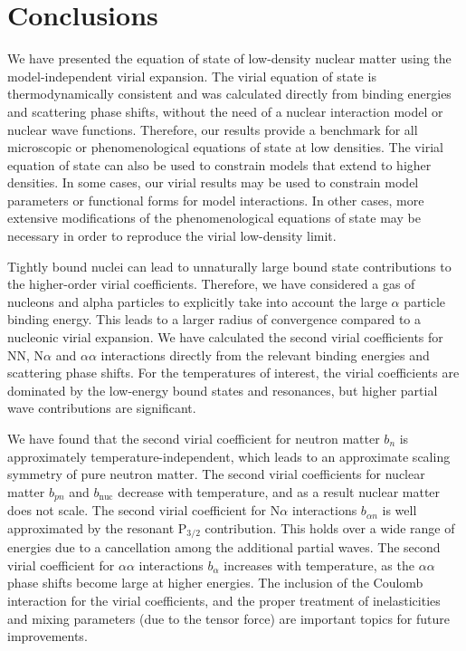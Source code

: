 \documentclass[aps,prc,twocolumn,showpacs,showkeys,amsmath,amssymb]{revtex4}
\begin{document}
\section{Conclusions}
\label{conclusions}

We have presented the equation of state of low-density nuclear 
matter using the model-independent virial expansion. The virial 
equation of state is thermodynamically consistent and was 
calculated directly from binding energies
and scattering phase shifts, without the need of a nuclear
interaction model or nuclear wave functions. Therefore, our
results provide a benchmark for all microscopic or phenomenological
equations of state at low densities. The virial equation of state
can also be used to constrain models that extend to higher densities.
In some cases, our virial results may be used to constrain model 
parameters or functional forms for model interactions. In other cases, 
more extensive modifications of the phenomenological equations of state
may be necessary in order to reproduce the virial low-density limit.

Tightly bound nuclei can lead to unnaturally large bound state
contributions to the higher-order virial coefficients. Therefore,
we have considered a gas of nucleons and alpha particles to 
explicitly take into account the large $\alpha$ particle binding
energy. This leads to a larger radius of convergence compared to 
a nucleonic virial expansion. We have calculated the second
virial coefficients for NN, N$\alpha$ and $\alpha\alpha$ interactions
directly from the relevant binding energies and scattering phase
shifts. For the temperatures of interest, the virial coefficients
are dominated by the low-energy bound states and resonances, but
higher partial wave contributions are significant.

We have found that the second virial coefficient for neutron matter $b_n$
is approximately temperature-independent, which leads to an 
approximate scaling
symmetry of pure neutron matter. The second virial coefficients for
nuclear matter $b_{pn}$ and $b_{\text{nuc}}$ decrease with temperature,
and as a result nuclear matter does not scale. The second virial
coefficient for N$\alpha$ interactions $b_{\alpha n}$
is well approximated by the
resonant P$_{3/2}$ contribution. This holds over a wide range of
energies due to a cancellation among the additional partial waves.
The second virial coefficient for $\alpha\alpha$ interactions 
$b_\alpha$ increases with temperature, as
the $\alpha\alpha$ phase shifts become large at higher energies.
The inclusion of the Coulomb interaction for the virial coefficients, 
and the proper treatment
of inelasticities and mixing parameters (due to the tensor force)
are important topics for future improvements.
\end{document}

